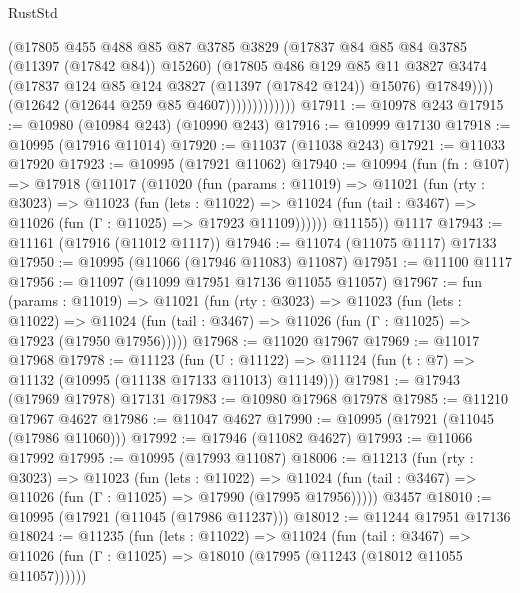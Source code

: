\begin{lexlean}{RustStd}
\begin{coremodule}
                              (@17805
                                @455
                                @488
                                @85
                                @87
                                @3785
                                @3829
                                (@17837 @84 @85 @84 @3785 (@11397 (@17842 @84)) @15260)
                                (@17805
                                  @486
                                  @129
                                  @85
                                  @11
                                  @3827
                                  @3474
                                  (@17837 @124 @85 @124 @3827 (@11397 (@17842 @124)) @15076)
                                  @17849))))
                          (@12642 (@12644 @259 @85 @4607)))))))))))))
@17911 := @10978 @243
@17915 := @10980 (@10984 @243) (@10990 @243)
@17916 := @10999 @17130
@17918 := @10995 (@17916 @11014)
@17920 := @11037 (@11038 @243)
@17921 := @11033 @17920
@17923 := @10995 (@17921 @11062)
@17940 := @10994
    (fun (fn : @107) =>
    @17918
      (@11017
        (@11020
          (fun (params : @11019) =>
          @11021
            (fun (rty : @3023) =>
            @11023
              (fun (lets : @11022) =>
              @11024 (fun (tail : @3467) => @11026 (fun (Γ : @11025) => @17923 @11109))))))
        @11155))
    @1117
@17943 := @11161 (@17916 (@11012 @1117))
@17946 := @11074 (@11075 @1117) @17133
@17950 := @10995 (@11066 (@17946 @11083) @11087)
@17951 := @11100 @1117
@17956 := @11097 (@11099 @17951 @17136 @11055 @11057)
@17967 := fun (params : @11019) =>
  @11021
    (fun (rty : @3023) =>
    @11023
      (fun (lets : @11022) =>
      @11024 (fun (tail : @3467) => @11026 (fun (Γ : @11025) => @17923 (@17950 @17956)))))
@17968 := @11020 @17967
@17969 := @11017 @17968
@17978 := @11123
    (fun (U : @11122) => @11124 (fun (t : @7) => @11132 (@10995 (@11138 @17133 @11013) @11149)))
@17981 := @17943 (@17969 @17978) @17131
@17983 := @10980 @17968 @17978
@17985 := @11210 @17967 @4627
@17986 := @11047 @4627
@17990 := @10995 (@17921 (@11045 (@17986 @11060)))
@17992 := @17946 (@11082 @4627)
@17993 := @11066 @17992
@17995 := @10995 (@17993 @11087)
@18006 := @11213
    (fun (rty : @3023) =>
    @11023
      (fun (lets : @11022) =>
      @11024 (fun (tail : @3467) => @11026 (fun (Γ : @11025) => @17990 (@17995 @17956)))))
    @3457
@18010 := @10995 (@17921 (@11045 (@17986 @11237)))
@18012 := @11244 @17951 @17136
@18024 := @11235
    (fun (lets : @11022) =>
    @11024
      (fun (tail : @3467) =>
      @11026 (fun (Γ : @11025) => @18010 (@17995 (@11243 (@18012 @11055 @11057))))))

\end{coremodule}
\end{lexlean}
